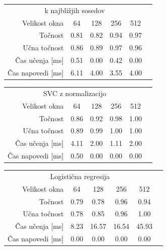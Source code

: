\documentclass[11pt,a4paper]{article}
\begin{document}
\begin{center}

    \begin{tabular}{r | c c c c c}
        \multicolumn{5}{c}{k najbližjih sosedov}\\
        \tiny{Velikost okna} & \small{64} & \small{128} & \small{256} & \small{512}\\ \hline
        \tiny{Točnost} & \small{0.81} & \small{0.82} & \small{0.94} & \small{0.97}\\
        \tiny{Učna točnost} & \small{0.86} & \small{0.89} & \small{0.97} & \small{0.96}\\
        \tiny{Čas učenja [ms]} & \small{0.51} & \small{0.00} & \small{0.42} & \small{0.00}\\
        \tiny{Čas napovedi [ms]} & \small{6.11} & \small{4.00} & \small{3.55} & \small{4.00}\\
        \end{tabular}

    \begin{tabular}{r | c c c c c}
        \multicolumn{5}{c}{SVC z normalizacijo}\\
        \tiny{Velikost okna} & \small{64} & \small{128} & \small{256} & \small{512}\\ \hline
        \tiny{Točnost} & \small{0.86} & \small{0.92} & \small{0.98} & \small{1.00}\\
        \tiny{Učna točnost} & \small{0.89} & \small{0.99} & \small{1.00} & \small{1.00}\\
        \tiny{Čas učenja [ms]} & \small{4.11} & \small{2.00} & \small{1.11} & \small{2.00}\\
        \tiny{Čas napovedi [ms]} & \small{0.50} & \small{0.00} & \small{0.00} & \small{0.00}\\
        \end{tabular}

    \begin{tabular}{r | c c c c c}
        \multicolumn{5}{c}{Logistična regresija}\\
        \tiny{Velikost okna} & \small{64} & \small{128} & \small{256} & \small{512}\\ \hline
        \tiny{Točnost} & \small{0.79} & \small{0.78} & \small{0.96} & \small{0.94}\\
        \tiny{Učna točnost} & \small{0.78} & \small{0.85} & \small{0.96} & \small{1.00}\\
        \tiny{Čas učenja [ms]} & \small{8.23} & \small{16.57} & \small{16.54} & \small{45.93}\\
        \tiny{Čas napovedi [ms]} & \small{0.00} & \small{0.00} & \small{0.00} & \small{0.00}\\
        \end{tabular}


\end{center}
\end{document}
